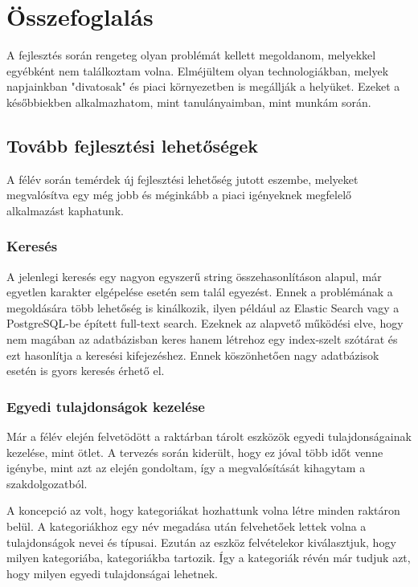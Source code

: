 \chapter{Összefoglalás}

A fejlesztés során rengeteg olyan problémát kellett megoldanom, melyekkel egyébként nem találkoztam volna.
Elméjültem olyan technologiákban, melyek napjainkban "divatosak" és piaci környezetben is megállják a helyüket.
Ezeket a későbbiekben alkalmazhatom, mint tanulányaimban, mint munkám során.

\section{Tovább fejlesztési lehetőségek}
A félév során temérdek új fejlesztési lehetőség jutott eszembe, melyeket megvalósítva egy még jobb és méginkább a piaci igényeknek megfelelő alkalmazást kaphatunk.

\subsection{Keresés}
A jelenlegi keresés egy nagyon egyszerű string összehasonlításon alapul, már egyetlen karakter elgépelése esetén sem talál egyezést.
Ennek a problémának a megoldására több lehetőség is kinálkozik, ilyen például az Elastic Search vagy a PostgreSQL-be épített full-text search.
Ezeknek az alapvető működési elve, hogy nem magában az adatbázisban keres hanem létrehoz egy index-szelt szótárat és ezt hasonlítja a keresési kifejezéshez.
Ennek köszönhetően nagy adatbázisok esetén is gyors keresés érhető el.

\subsection{Egyedi tulajdonságok kezelése}
Már a félév elején felvetödött a raktárban tárolt eszközök egyedi tulajdonságainak kezelése, mint ötlet.
A tervezés során kiderült, hogy ez jóval több időt venne igénybe, mint azt az elején gondoltam, így a megvalósítását kihagytam a szakdolgozatból.

A koncepció az volt, hogy kategoriákat hozhattunk volna létre minden raktáron belül.
A kategoriákhoz egy név megadása után felvehetőek lettek volna a tulajdonságok nevei és típusai.
Ezután az eszköz felvételekor kiválasztjuk, hogy milyen kategoriába, kategoriákba tartozik. 
Így a kategoriák révén már tudjuk azt, hogy milyen egyedi tulajdonságai lehetnek.
